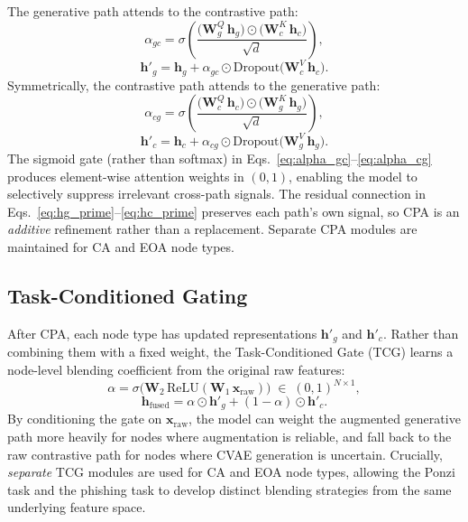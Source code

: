 \documentclass[conference]{IEEEtran}
\begin{document}
The generative path attends to the contrastive path:
\begin{equation}
  \alpha_{gc} = \sigma\!\left(
    \frac{\bigl(\mathbf{W}^Q_g\,\mathbf{h}_g\bigr)
          \odot
          \bigl(\mathbf{W}^K_c\,\mathbf{h}_c\bigr)}
         {\sqrt{d}}
  \right),
  \label{eq:alpha_gc}
\end{equation}
\begin{equation}
  \mathbf{h}'_g = \mathbf{h}_g +
    \alpha_{gc} \odot \mathrm{Dropout}\!\bigl(\mathbf{W}^V_c\,\mathbf{h}_c\bigr).
  \label{eq:hg_prime}
\end{equation}
Symmetrically, the contrastive path attends to the generative path:
\begin{equation}
  \alpha_{cg} = \sigma\!\left(
    \frac{\bigl(\mathbf{W}^Q_c\,\mathbf{h}_c\bigr)
          \odot
          \bigl(\mathbf{W}^K_g\,\mathbf{h}_g\bigr)}
         {\sqrt{d}}
  \right),
  \label{eq:alpha_cg}
\end{equation}
\begin{equation}
  \mathbf{h}'_c = \mathbf{h}_c +
    \alpha_{cg} \odot \mathrm{Dropout}\!\bigl(\mathbf{W}^V_g\,\mathbf{h}_g\bigr).
  \label{eq:hc_prime}
\end{equation}
The sigmoid gate (rather than softmax) in
Eqs.~\eqref{eq:alpha_gc}--\eqref{eq:alpha_cg} produces
element-wise attention weights in $(0,1)$, enabling the model to
selectively suppress irrelevant cross-path signals.
The residual connection in Eqs.~\eqref{eq:hg_prime}--\eqref{eq:hc_prime}
preserves each path's own signal, so CPA is an \emph{additive} refinement
rather than a replacement.  Separate CPA modules are maintained for
CA and EOA node types.

\subsection{Task-Conditioned Gating}

After CPA, each node type has updated representations $\mathbf{h}'_g$
and $\mathbf{h}'_c$.  Rather than combining them with a fixed weight,
the Task-Conditioned Gate (TCG) learns a node-level blending coefficient
from the original raw features:
\begin{equation}
  \alpha = \sigma\!\bigl(
    \mathbf{W}_2\,\mathrm{ReLU}(\mathbf{W}_1\,\mathbf{x}_{\mathrm{raw}})
  \bigr) \;\in\; (0,1)^{N\times 1},
  \label{eq:gate}
\end{equation}
\begin{equation}
  \mathbf{h}_{\mathrm{fused}} = \alpha \odot \mathbf{h}'_g
    + (1-\alpha) \odot \mathbf{h}'_c.
  \label{eq:fused}
\end{equation}
By conditioning the gate on $\mathbf{x}_{\mathrm{raw}}$, the model
can weight the augmented generative path more heavily for nodes where
augmentation is reliable, and fall back to the raw contrastive path
for nodes where CVAE generation is uncertain.
Crucially, \emph{separate} TCG modules are used for CA and EOA node
types, allowing the Ponzi task and the phishing task to develop
distinct blending strategies from the same underlying feature space.
\end{document}
